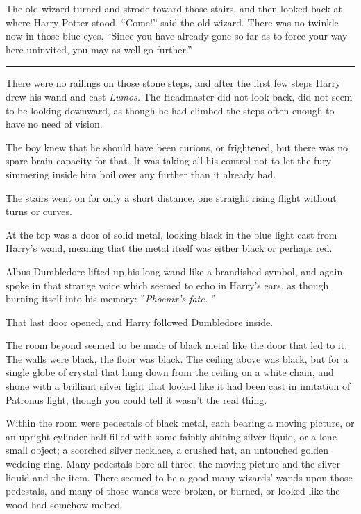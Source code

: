 The old wizard turned and strode toward those stairs, and then looked
back at where Harry Potter stood. ``Come!'' said the old wizard. There
was no twinkle now in those blue eyes. ``Since you have already gone so
far as to force your way here uninvited, you may as well go further.''

\begin{center}\rule{3in}{0.4pt}\end{center}

There were no railings on those stone steps, and after the first few
steps Harry drew his wand and cast \emph{Lumos.} The Headmaster did not
look back, did not seem to be looking downward, as though he had climbed
the steps often enough to have no need of vision.

The boy knew that he should have been curious, or frightened, but there
was no spare brain capacity for that. It was taking all his control not
to let the fury simmering inside him boil over any further than it
already had.

The stairs went on for only a short distance, one straight rising flight
without turns or curves.

At the top was a door of solid metal, looking black in the blue light
cast from Harry's wand, meaning that the metal itself was either black
or perhaps red.

Albus Dumbledore lifted up his long wand like a brandished symbol, and
again spoke in that strange voice which seemed to echo in Harry's ears,
as though burning itself into his memory: ''\emph{Phoenix's fate.} ''

That last door opened, and Harry followed Dumbledore inside.

The room beyond seemed to be made of black metal like the door that led
to it. The walls were black, the floor was black. The ceiling above was
black, but for a single globe of crystal that hung down from the ceiling
on a white chain, and shone with a brilliant silver light that looked
like it had been cast in imitation of Patronus light, though you could
tell it wasn't the real thing.

Within the room were pedestals of black metal, each bearing a moving
picture, or an upright cylinder half-filled with some faintly shining
silver liquid, or a lone small object; a scorched silver necklace, a
crushed hat, an untouched golden wedding ring. Many pedestals bore all
three, the moving picture and the silver liquid and the item. There
seemed to be a good many wizards' wands upon those pedestals, and many
of those wands were broken, or burned, or looked like the wood had
somehow melted.

